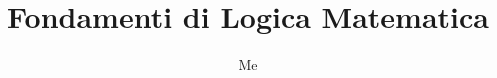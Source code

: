 \documentclass[fontsize = 11 pt, paper=A4, oneside, index=totoc, hyperref]{article}
\theoremstyle{definition}
\theoremstyle{plain}
\begin{document}
\title{Fondamenti di Logica Matematica}
\author{Me}

\maketitle
\tableofcontents
\pagebreak




\end{document}
